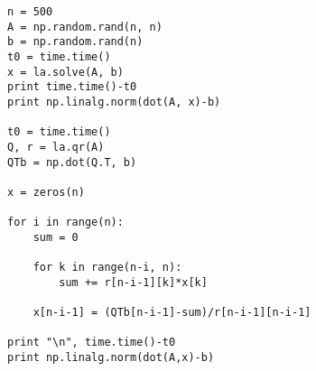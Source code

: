 \documentclass[a4paper]{article}
\begin{document}
\begin{description}
\begin{lstlisting}
n = 500
A = np.random.rand(n, n)
b = np.random.rand(n)
t0 = time.time() 
x = la.solve(A, b)
print time.time()-t0
print np.linalg.norm(dot(A, x)-b)

t0 = time.time()
Q, r = la.qr(A)
QTb = np.dot(Q.T, b)
  
x = zeros(n)

for i in range(n):
    sum = 0

    for k in range(n-i, n):
        sum += r[n-i-1][k]*x[k]
        
    x[n-i-1] = (QTb[n-i-1]-sum)/r[n-i-1][n-i-1]
    
print "\n", time.time()-t0
print np.linalg.norm(dot(A,x)-b)

\end{lstlisting}


\end{description}
\end{document}
